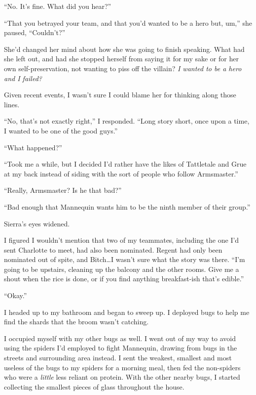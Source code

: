 ``No.  It's fine.  What did you hear?''



``That you betrayed your team, and that you'd wanted to be a hero but, um,'' she paused, ``Couldn't?''



She'd changed her mind about how she was going to finish speaking.  What had she left out, and had she stopped herself from saying it for my sake or for her own self-preservation, not wanting to piss off the villain?  \emph{I wanted to be a hero and I failed?}



Given recent events, I wasn't sure I could blame her for thinking along those lines.



``No, that's not exactly right,'' I responded.  ``Long story short, once upon a time, I wanted to be one of the good guys.''



``What happened?''



``Took me a while, but I decided I'd rather have the likes of Tattletale and Grue at my back instead of siding with the sort of people who follow Armsmaster.''



``Really, Armsmaster?  Is he that bad?''



``Bad enough that Mannequin wants him to be the ninth member of their group.''



Sierra's eyes widened.



I figured I wouldn't mention that two of my teammates, including the one I'd sent Charlotte to meet, had also been nominated.  Regent had only been nominated out of spite, and Bitch\ldots I wasn't sure what the story was there.  ``I'm going to be upstairs, cleaning up the balcony and the other rooms.  Give me a shout when the rice is done, or if you find anything breakfast-ish that's edible.''



``Okay.''



I headed up to my bathroom and began to sweep up.  I deployed bugs to help me find the shards that the broom wasn't catching.



I occupied myself with my other bugs as well.  I went out of my way to avoid using the spiders I'd employed to fight Mannequin, drawing from bugs in the streets and surrounding area instead.  I sent the weakest, smallest and most useless of the bugs to my spiders for a morning meal, then fed the non-spiders who were a \emph{little} less reliant on protein.  With the other nearby bugs, I started collecting the smallest pieces of glass throughout the house.




